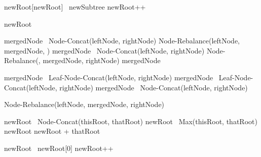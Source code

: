 \begin{listing}[ht!]
\begin{algorithmic}
                \State newRoot[newRoot\ts[len]] \la\ newSubtree
                \State newRoot++
            \EndIf

            \State \Return newRoot
        \EndFunction

                \State mergedNode \la\ Node-Concat(leftNode, rightNode)                
                \State \Return Node-Rebalance(leftNode, mergedNode, \nil{})
                \State mergedNode \la\ Node-Concat(leftNode, rightNode)                
                \State \Return Node-Rebalance(\nil{}, mergedNode, rightNode)
            \Else
                \State mergedNode \la\ \nil{}

                    \State mergedNode \la\ Leaf-Node-Concat(leftNode, rightNode)
                \Else
                        \State mergedNode \la\ Leaf-Node-Concat(leftNode, rightNode)
                    \Else
                        \State mergedNode \la\ Node-Concat(leftNode, rightNode)
                    \EndIf
                \EndIf

                \State \Return Node-Rebalance(leftNode, mergedNode, rightNode)
            \EndIf

            \State \Return \nil{}
        \EndFunction

        \State

            \State newRoot \la\ Node-Concat(thisRoot, thatRoot)
            \State newRoot \la\ Max(thisRoot, thatRoot)
            \State newRoot \la newRoot + thatRoot

                \State newRoot \la\ newRoot[0]
            \Else
                \State newRoot++
            \EndIf        

            \State \Return \nil{}
        \EndFunction

    \end{algorithmic}
\end{listing}
